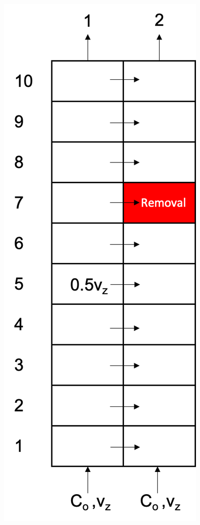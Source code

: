 \FloatBarrier
\newpage

\begin{figure}[ht] 
\centering
\begin{minipage}{.5\textwidth}
  \centering
  \includegraphics[width=0.78\linewidth]{images/MultiChanBubbleRemoval.png}

\end{minipage}
\end{figure}
